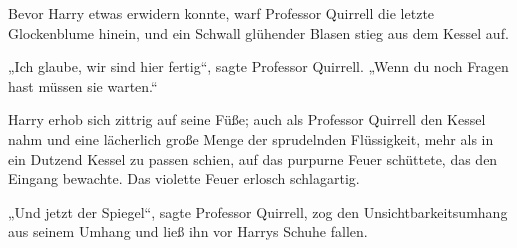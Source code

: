 Bevor Harry etwas erwidern konnte, warf Professor Quirrell die letzte Glockenblume hinein, und ein Schwall glühender Blasen stieg aus dem Kessel auf.

„Ich glaube, wir sind hier fertig“, sagte Professor Quirrell. „Wenn du noch Fragen hast müssen sie warten.“

Harry erhob sich zittrig auf seine Füße; auch als Professor Quirrell den Kessel nahm und eine lächerlich große Menge der sprudelnden Flüssigkeit, mehr als in ein Dutzend Kessel zu passen schien, auf das purpurne Feuer schüttete, das den Eingang bewachte.
% 
Das violette Feuer erlosch schlagartig.

„Und jetzt der Spiegel“, sagte Professor Quirrell, zog den Unsichtbarkeitsumhang aus seinem Umhang und ließ ihn vor Harrys Schuhe fallen.


